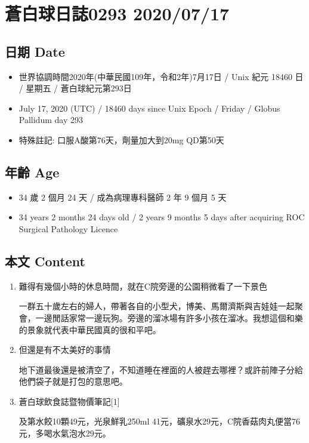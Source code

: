 \documentclass[
]{article}
\providecommand{\tightlist}{%
  \setlength{\itemsep}{0pt}\setlength{\parskip}{0pt}}
\begin{document}
\hypertarget{ux84bcux767dux7403ux65e5ux8a8c0293-20200717}{%
\section{蒼白球日誌0293
2020/07/17}\label{ux84bcux767dux7403ux65e5ux8a8c0293-20200717}}

\hypertarget{ux65e5ux671f-date-15}{%
\subsection{日期 Date}\label{ux65e5ux671f-date-15}}

\begin{itemize}
\tightlist
\item
  世界協調時間2020年(中華民國109年，令和2年)7月17日 / Unix 紀元 18460 日
  / 星期五 / 蒼白球紀元第293日
\item
  July 17, 2020 (UTC) / 18460 days since Unix Epoch / Friday / Globus
  Pallidum day 293
\item
  特殊註記: 口服A酸第76天，劑量加大到20mg QD第50天
\end{itemize}

\hypertarget{ux5e74ux9f61-age-15}{%
\subsection{年齡 Age}\label{ux5e74ux9f61-age-15}}

\begin{itemize}
\tightlist
\item
  34 歲 2 個月 24 天 / 成為病理專科醫師 2 年 9 個月 5 天
\item
  34 years 2 months 24 days old / 2 years 9 months 5 days after
  acquiring ROC Surgical Pathology Licence
\end{itemize}

\hypertarget{ux672cux6587-content-15}{%
\subsection{本文 Content}\label{ux672cux6587-content-15}}

\begin{enumerate}
\def\labelenumi{\arabic{enumi}.}
\item
  難得有幾個小時的休息時間，就在C院旁邊的公園稍微看了一下景色

  一群五十歲左右的婦人，帶著各自的小型犬，博美、馬爾濟斯與吉娃娃一起聚會，一邊閒話家常一邊玩狗。旁邊的溜冰場有許多小孩在溜冰。我想這個和樂的景象就代表中華民國真的很和平吧。
\item
  但還是有不太美好的事情

  地下道最後還是被清空了，不知道睡在裡面的人被趕去哪裡？或許前陣子分給他們袋子就是打包的意思吧。
\item
  蒼白球飲食誌暨物價筆記{[}1{]}

  及第水餃10顆49元，光泉鮮乳250ml
  41元，礦泉水29元，C院香菇肉丸便當76元，多喝水氣泡水29元。
\end{enumerate}
\end{document}
